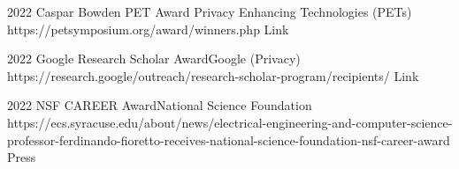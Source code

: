  

\begin{awards}
	\awardentry
	{2022}
	{Caspar Bowden PET Award}%
	{Privacy Enhancing Technologies (PETs)}
	{https://petsymposium.org/award/winners.php}
	{Link}

	\awardentry
	{2022}
	{Google Research Scholar Award}{Google (Privacy)}
	{https://research.google/outreach/research-scholar-program/recipients/}
	{Link}

	\awardentry
	{2022}
	{NSF CAREER Award}{National Science Foundation}
	{https://ecs.syracuse.edu/about/news/electrical-engineering-and-computer-science-professor-ferdinando-fioretto-receives-national-science-foundation-nsf-career-award}
	{Press}


\end{awards}
